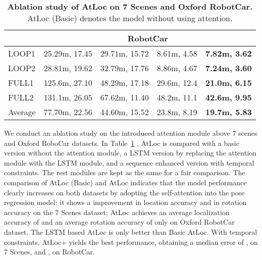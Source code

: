 \documentclass[letterpaper]{article}
\begin{document}
\begin{table}[t]
{\begin{tabular}{l|cccc}
\multicolumn{1}{c|}{} & \multicolumn{4}{c}{RobotCar}                                                                                                                                    \\ \hline
LOOP1                 & 25.29m, 17.45                                         & 29.71m, 15.72                                              & 8.61m, 4.58          & \textbf{7.82m, 3.62} \\
LOOP2                 & 28.81m, 19.62                                         & 32.79m, 17.76                                              & 8.86m, 4.67          & \textbf{7.24m, 3.60} \\
FULL1                 & 125.6m, 27.10                                         & 48.29m, 17.18                                              & 29.6m, 12.4          & \textbf{21.0m, 6.15} \\
FULL2                 & 131.1m, 26.05                                         & 67.62m, 11.40                                              & 48.2m, 11.1          & \textbf{42.6m, 9.95} \\ \hline
Average               & 77.70m, 22.56                                         & 44.60m, 15.52                                              & 23.8m, 8.19          & \textbf{19.7m, 5.83}
\end{tabular}
}
\caption{\textbf{Ablation study of AtLoc on 7 Scenes and Oxford RobotCar.} AtLoc (Basic) denotes the model without using attention. }
	\label{tbl:ablation}
    \vspace{-0.5cm}
\end{table}

We conduct an ablation study on the introduced attention module above 7 scenes and Oxford RoboCar datasets.
In Table~\ref{tbl:ablation} , AtLoc is compared with a basic version without the attention module, a LSTM version by replacing the attention module with the LSTM module, and a sequence enhanced version with temporal constraints. The rest modules are kept as the same for a fair comparison.
The comparison of AtLoc (Basic) and AtLoc indicates that the model performance clearly increases on both datasets by adopting the self-attention into the pose regression model: it shows a  improvement in location accuracy and  in rotation accuracy on the 7 Scenes dataset; AtLoc achieves an average localization accuracy of  and an average rotation accuracy of only  on Oxford RobotCar dataset. The LSTM based AtLoc is only better than Basic AtLoc. With temporal constraints, AtLoc+ yields the best performance, obtaining a median error of ,  on 7 Scenes, and ,  on RobotCar.
\end{document}
